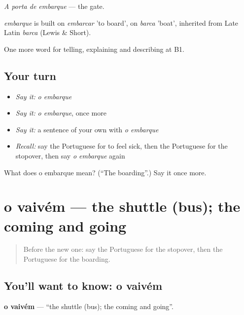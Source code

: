 \emph{A porta de embarque} — the gate.

\begin{cousinweb}
\emph{embarque} is built on \emph{embarcar} 'to board', on \emph{barca} 'boat', inherited from Late Latin \emph{barca} (Lewis \& Short).
\end{cousinweb}

\begin{grammarlens}[title={What you've built}]
One more word for telling, explaining and describing at B1.
\end{grammarlens}

\subsection*{Your turn}
\begin{itemize}
\raggedright
  \item \emph{Say it:} \emph{o embarque}
  \item \emph{Say it:} \emph{o embarque}, once more
  \item \emph{Say it:} a sentence of your own with \emph{o embarque}
  \item \emph{Recall:} say the Portuguese for to feel sick, then the Portuguese for the stopover, then say \emph{o embarque} again
\end{itemize}

\begin{tcolorbox}[breakable,colback=teal!4,colframe=teal!35!black,title={Before you move on}]
What does o embarque mean? (\textquotedblleft{}The boarding\textquotedblright{}.) Say it once more.
\end{tcolorbox}
\section[o vaivém]{o vaivém — the shuttle (bus); the coming and going}

\label{lesson:PT-C421-vaivem}



\begin{quote}
Before the new one: say the Portuguese for the stopover, then the Portuguese for the boarding.
\end{quote}

\subsection*{You'll want to know: o vaivém}
\textbf{o vaivém} — \textquotedblleft{}the shuttle (bus); the coming and going\textquotedblright{}.

